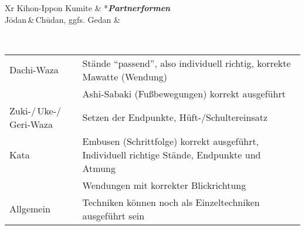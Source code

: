 \begin{tcolorbox}[colframe=YBELT,colback=white,coltitle=black,title=9. \& 8. Kyu:\indent Kihon-Ido Kata - Partnerformen - Erwartungshorizont]
\begin{minipage}[t]{0.45\textwidth}
\begin{tabularx}{\textwidth}{Xr}
			\midrule
			Kihon-Ippon Kumite & *{\textit{\textbf{Partnerformen}}} \\
			J\={o}dan\,\&\,Ch\={u}dan, ggfs. Gedan	& \\
			\midrule
		\end{tabularx}
	\end{minipage}\\
	\null\vfill\null
	{\small\begin{tabularx}{\textwidth}{ll}
		\midrule
		Dachi-Waza					& Stände \textquotedblleft passend\textquotedblright , also individuell richtig, korrekte Mawatte (Wendung) \\
		& Ashi-Sabaki (Fußbewegungen) korrekt ausgeführt \\
		Zuki-/\,Uke-/\,Geri-Waza	& Setzen der Endpunkte, Hüft-/Schultereinsatz \\
		Kata						& Embusen (Schrittfolge) korrekt ausgeführt, Individuell richtige Stände, Endpunkte und Atmung \\
		& Wendungen mit korrekter Blickrichtung \\
		Allgemein					& Techniken können noch als Einzeltechniken ausgeführt sein \\
		\midrule
	\end{tabularx}}\null\vfill\null
\end{tcolorbox}
